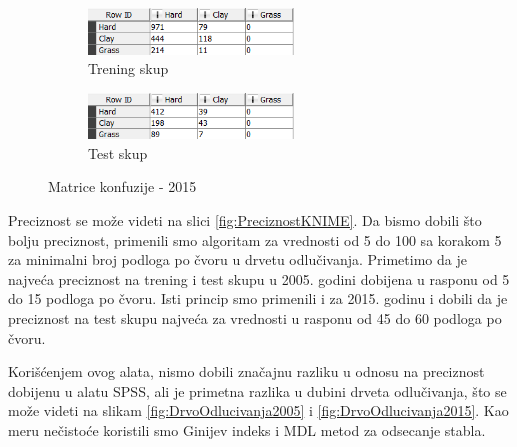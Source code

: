 \documentclass[a4paper]{article}
\begin{document}
\begin{figure}[H]
	\begin{subfigure}[h]{\textwidth}
		\begin{center}
			\includegraphics[width=0.6\textwidth]{Klasifikacija/DrvoOdlucivanja/2015/MatricaKonfuzijeTrening.png}
		\end{center}
		\caption{Trening skup}
		\label{fig:MatricaKnfuzijeTrening2015}
	\end{subfigure}

	\vspace{0.5cm}
	\begin{subfigure}[h]{\textwidth}
		\begin{center}
			\includegraphics[width=0.6\textwidth]{Klasifikacija/DrvoOdlucivanja/2015/MatricaKonfuzijeTest.png}
		\end{center}
		\caption{Test skup}
		\label{fig:MatricaKnfuzijeTest2015}
	\end{subfigure}
	\caption{Matrice konfuzije - 2015}
	\label{fig:MatricaKnfuzije2015}
\end{figure}

Preciznost se može videti na slici \ref{fig:PreciznostKNIME}.
Da bismo dobili što bolju preciznost, primenili smo algoritam za vrednosti od 5 do 100 sa korakom 5 za minimalni broj podloga po čvoru u drvetu odlučivanja.
Primetimo da je najveća preciznost na trening i test skupu u 2005. godini dobijena u rasponu od 5 do 15 podloga po čvoru.
Isti princip smo primenili i za 2015. godinu i dobili da je preciznost na test skupu najveća za vrednosti u rasponu od 45 do 60 podloga po čvoru.

Korišćenjem ovog alata, nismo dobili značajnu razliku u odnosu na preciznost dobijenu u alatu SPSS, ali je primetna razlika u dubini drveta odlučivanja, što se može videti na slikam \ref{fig:DrvoOdlucivanja2005} i \ref{fig:DrvoOdlucivanja2015}. Kao meru nečistoće koristili smo Ginijev indeks i MDL metod za odsecanje stabla.
\end{document}
